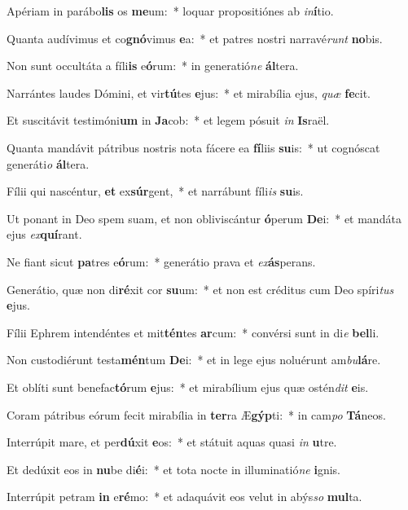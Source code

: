 \item Apériam in parábo\textbf{lis} os \textbf{me}um:~* loquar propositiónes ab \textit{in}\textbf{í}tio.
\item Quanta audívimus et co\textbf{gnó}vimus \textbf{e}a:~* et patres nostri narravé\textit{runt} \textbf{no}bis.
\item Non sunt occultáta a fíli\textbf{is} e\textbf{ó}rum:~* in generatió\textit{ne} \textbf{ál}tera.
\item Narrántes laudes Dómini, et vir\textbf{tú}tes \textbf{e}jus:~* et mirabília ejus, \textit{quæ} \textbf{fe}cit.
\item Et suscitávit testimóni\textbf{um} in \textbf{Ja}cob:~* et legem pósuit \textit{in} \textbf{Is}raël.
\item Quanta mandávit pátribus nostris nota fácere ea \textbf{fí}liis \textbf{su}is:~* ut cognóscat generáti\textit{o} \textbf{ál}tera.
\item Fílii qui nascéntur, \textbf{et} ex\textbf{súr}gent,~* et narrábunt fíli\textit{is} \textbf{su}is.
\item Ut ponant in Deo spem suam, et non obliviscántur \textbf{ó}perum \textbf{De}i:~* et mandáta ejus \textit{ex}\textbf{quí}rant.
\item Ne fiant sicut \textbf{pa}tres e\textbf{ó}rum:~* generátio prava et \textit{ex}\textbf{ás}perans.
\item Generátio, quæ non di\textbf{ré}xit cor \textbf{su}um:~* et non est créditus cum Deo spíri\textit{tus} \textbf{e}jus.
\item Fílii Ephrem intendéntes et mit\textbf{tén}tes \textbf{ar}cum:~* convérsi sunt in di\textit{e} \textbf{bel}li.
\item Non custodiérunt testa\textbf{mén}tum \textbf{De}i:~* et in lege ejus noluérunt am\textit{bu}\textbf{lá}re.
\item Et oblíti sunt benefac\textbf{tó}rum \textbf{e}jus:~* et mirabílium ejus quæ ostén\textit{dit} \textbf{e}is.
\item Coram pátribus eórum fecit mirabília in \textbf{ter}ra Æ\textbf{gýp}ti:~* in cam\textit{po} \textbf{Tá}neos.
\item Interrúpit mare, et per\textbf{dú}xit \textbf{e}os:~* et státuit aquas quasi \textit{in} \textbf{u}tre.
\item Et dedúxit eos in \textbf{nu}be di\textbf{é}i:~* et tota nocte in illuminatió\textit{ne} \textbf{i}gnis.
\item Interrúpit petram \textbf{in} e\textbf{ré}mo:~* et adaquávit eos velut in abýs\textit{so} \textbf{mul}ta.
